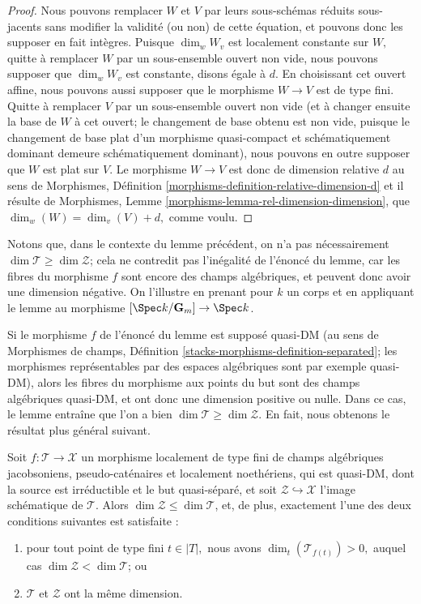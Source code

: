 \begin{proof}
\medskip\noindent
Nous pouvons remplacer $W$ et $V$ par leurs sous-schémas réduits sous-jacents
sans modifier la validité (ou non) de cette équation,
et pouvons donc les supposer en fait intègres.
Puisque $\dim_w W_v$ est localement constante sur $W,$ quitte à remplacer $W$
par un sous-ensemble ouvert non vide, nous pouvons supposer que $\dim_w W_v$
est constante, disons égale à $d$. En choisissant cet ouvert affine,
nous pouvons aussi supposer que le morphisme $W\to V$ est de type fini.
Quitte à remplacer $V$ par un sous-ensemble ouvert non vide
(et à changer ensuite la base de $W$ à cet ouvert; le changement de base obtenu
est non vide, puisque le changement de base plat d'un morphisme quasi-compact
et schématiquement
dominant demeure schématiquement dominant),
nous pouvons en outre supposer que $W$ est plat sur $V$.
Le morphisme $W\to V$ est donc de dimension relative $d$
au sens de
Morphismes, Définition
\ref{morphisms-definition-relative-dimension-d}
et il résulte de
Morphismes, Lemme \ref{morphisms-lemma-rel-dimension-dimension},
que $\dim_w(W) = \dim_v(V) + d,$ comme voulu.
\end{proof}

\begin{remark}
\label{remark-negative-dimension}
Notons que, dans le contexte du lemme précédent,
on n'a pas nécessairement $\dim \mathcal{T} \geq \dim \mathcal{Z}$; cela ne
contredit pas l'inégalité de l'énoncé du lemme, car
les fibres du morphisme $f$ sont encore des champs algébriques, et
peuvent donc avoir une dimension négative. On l'illustre en prenant
pour $k$ un corps et en appliquant le lemme au morphisme
$[\Spec k/\mathbf{G}_m] \to \Spec k$.

\medskip\noindent
Si le morphisme $f$ de l'énoncé du lemme est supposé
quasi-DM (au sens de
Morphismes de champs, Définition
\ref{stacks-morphisms-definition-separated}; les morphismes
représentables par des espaces algébriques sont par exemple quasi-DM),
alors les fibres du morphisme aux points du but
sont des champs algébriques quasi-DM, et ont donc une dimension
positive ou nulle. Dans ce cas, le lemme entraîne
que l'on a bien $\dim \mathcal{T} \geq \dim \mathcal{Z}$. En fait, nous obtenons
le résultat plus général suivant.
\end{remark}

\begin{lemma}
\label{lemma-dims-of-images-two}
Soit $f: \mathcal{T} \to \mathcal{X}$ un morphisme localement de type fini
de champs algébriques jacobsoniens, pseudo-caténaires et localement
noethériens,
qui est quasi-DM,
dont la source est irréductible et le but quasi-séparé,
et soit $\mathcal{Z} \hookrightarrow \mathcal{X}$ l'image
schématique de $\mathcal{T}$.
Alors $\dim \mathcal{Z} \leq \dim \mathcal{T}$,
et, de plus, exactement l'une des deux conditions suivantes est satisfaite :
\begin{enumerate}
\item pour tout point de type fini $t \in |T|,$
nous avons
$\dim_t(\mathcal{T}_{f(t)}) > 0,$ auquel
cas $\dim \mathcal{Z} < \dim \mathcal{T}$; ou
\item $\mathcal{T}$ et $\mathcal{Z}$
ont la même dimension.
\end{enumerate}
\end{lemma}

